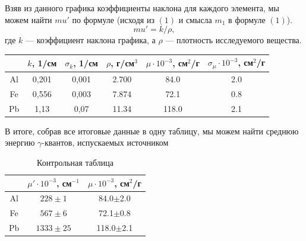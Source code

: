 \documentclass[a4paper,12pt]{extarticle}
\begin{document}
\begin{minipage}{1\textwidth}
\end{minipage}

Взяв из данного графика коэффициенты наклона для каждого элемента, мы можем найти $mu'$ по формуле (исходя из $(1)$ и смысла $m_1$ в формуле $(1)$).
\[mu' = k/\rho,\]
где $k$ --- коэффициент наклона графика, а $\rho$ --- плотность исследуемого вещества.



\begin{table}[h]
\begin{center}
\begin{tabular}{|c|c|c|c|c|c|}
\hline
   & $k$, 1/см & $\sigma_k$, 1/см & $\rho$, г/см$^3$ & $\mu \cdot 10^{-3}$, см$^2$/г& $\sigma_{\mu} \cdot 10^{-3}$, см$^2$/г\\ \hline
Al & 0,201     & 0,001            & 2.700& 84.0& 2.0\\ \hline
Fe & 0,556     & 0,003            & 7.874& 72.1& 0.8\\ \hline
Pb & 1,13      & 0,07             & 11.34& 118.0& 2.1\\ \hline
\end{tabular}
\end{center}
\end{table}
В итоге, собрав все итоговые данные в одну таблицу, мы можем найти среднюю энергию $\gamma$-квантов, испускаемых источником
\begin{table}[h]
\begin{center}
\begin{tabular}{|c|c|c|}
\hline
   & $\mu' \cdot 10^{-3}$, см$^{-1}$& $\mu \cdot 10^{-3}$, см$^2$/г\\ \hline
Al & $228\pm1$& 84.0$\pm$2.0\\ \hline
Fe & $567\pm6$& 72.1$\pm$0.8\\ \hline
Pb & $1333\pm25$& 118.0$\pm$2.1\\ \hline
\end{tabular}
\caption{Контрольная таблица}
\label{table_3}
\end{center}
\end{table}
\end{document}
